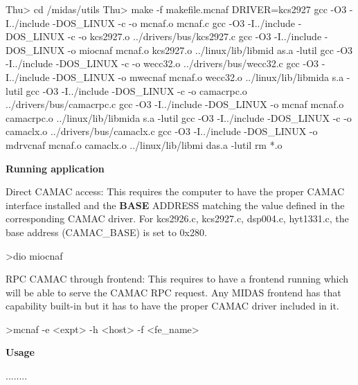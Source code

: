 \begin{DoxyCode}
Thu> cd /midas/utils
Thu> make -f makefile.mcnaf DRIVER=kcs2927
gcc -O3 -I../include -DOS_LINUX -c -o mcnaf.o mcnaf.c
gcc -O3 -I../include -DOS_LINUX -c -o kcs2927.o ../drivers/bus/kcs2927.c
gcc -O3 -I../include -DOS_LINUX -o miocnaf mcnaf.o kcs2927.o  ../linux/lib/libmid
      as.a -lutil
gcc -O3 -I../include -DOS_LINUX -c -o wecc32.o ../drivers/bus/wecc32.c
gcc -O3 -I../include -DOS_LINUX -o mwecnaf mcnaf.o wecc32.o  ../linux/lib/libmida
      s.a -lutil 
gcc -O3 -I../include -DOS_LINUX -c -o camacrpc.o ../drivers/bus/camacrpc.c
gcc -O3 -I../include -DOS_LINUX -o mcnaf mcnaf.o camacrpc.o  ../linux/lib/libmida
      s.a -lutil 
gcc -O3 -I../include -DOS_LINUX -c -o camaclx.o ../drivers/bus/camaclx.c
gcc -O3 -I../include -DOS_LINUX -o mdrvcnaf mcnaf.o camaclx.o  ../linux/lib/libmi
      das.a -lutil 
rm *.o
\end{DoxyCode}



\begin{DoxyItemize}
\item {\bfseries  Running application }
\begin{DoxyItemize}
\item Direct CAMAC access: This requires the computer to have the proper CAMAC interface installed and the {\bfseries BASE} ADDRESS matching the value defined in the corresponding CAMAC driver. For kcs2926.c, kcs2927.c, dsp004.c, hyt1331.c, the base address (CAMAC\_\-BASE) is set to 0x280. 
\begin{DoxyCode}
   >dio miocnaf
\end{DoxyCode}

\item RPC CAMAC through frontend: This requires to have a frontend running which will be able to serve the CAMAC RPC request. Any MIDAS frontend has that capability built-\/in but it has to have the proper CAMAC driver included in it. 
\begin{DoxyCode}
     >mcnaf -e <expt> -h <host> -f <fe_name>
\end{DoxyCode}

\end{DoxyItemize}
\end{DoxyItemize}


\begin{DoxyItemize}
\item {\bfseries  Usage } 
\begin{DoxyCode}
  ........
\end{DoxyCode}

\end{DoxyItemize}



